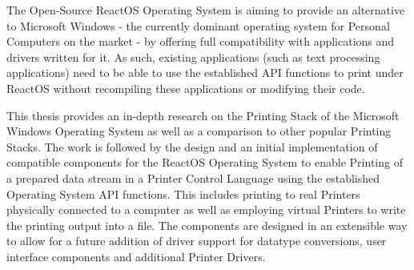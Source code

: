 The Open-Source ReactOS Operating System is aiming to provide an alternative to Microsoft Windows - the currently dominant operating system for Personal Computers on the market - by offering full compatibility with applications and drivers written for it.
As such, existing applications (such as text processing applications) need to be able to use the established API functions to print under ReactOS without recompiling these applications or modifying their code.

This thesis provides an in-depth research on the Printing Stack of the Microsoft Windows Operating System as well as a comparison to other popular Printing Stacks.
The work is followed by the design and an initial implementation of compatible components for the ReactOS Operating System to enable Printing of a prepared data stream in a Printer Control Language using the established Operating System API functions.
This includes printing to real Printers physically connected to a computer as well as employing virtual Printers to write the printing output into a file.
The components are designed in an extensible way to allow for a future addition of driver support for datatype conversions, user interface components and additional Printer Drivers.
